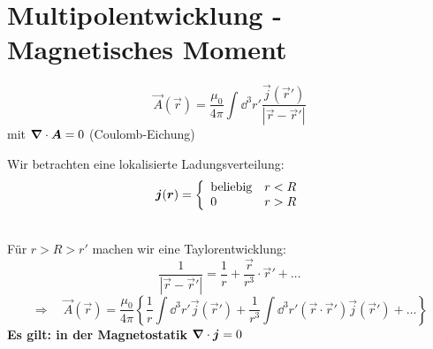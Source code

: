 \section{Multipolentwicklung - Magnetisches Moment}

\begin{equation*}
\vec{A}(\vec{r}) = \frac{\mu_0}{4 \pi} \int \dd ^3 r' \frac{\vec{j}(\vec{r}')}{|\vec{r} - \vec{r}'|}
\end{equation*}
mit $ \bm{\nabla} \cdot \bm{A} = 0 $ (Coulomb-Eichung)\\
\begin{minipage}{.5\linewidth}
	Wir betrachten eine lokalisierte Ladungsverteilung:
	\begin{equation*}
	\bm{j}(\bm{r}) = \left\{ \begin{array}{ll} {\textrm{beliebig}} & {r < R} \\ {0} & {r > R} \end{array} \right.
	\end{equation*}
\end{minipage}%
\begin{minipage}{.5\linewidth}
	\flushright
\end{minipage}%
\\
Für $ r > R > r' $ machen wir eine Taylorentwicklung:
\begin{equation*}
\frac{1}{|\vec{r} - \vec{r}'|} = \frac{1}{r} + \frac{\vec{r}}{r^3} \cdot \vec{r}' + \dots
\end{equation*}
\begin{equation*}
\Rightarrow \quad \vec{A}(\vec{r}) = \frac{\mu_0}{4 \pi} \left\{\frac{1}{r} \int \dd^3r' \vec{j} (\vec{r}') + \frac{1}{r^3} \int \dd ^3 r' (\vec{r} \cdot \vec{r}') \vec{j}(\vec{r}') + \dots \right\}
\end{equation*}
\textbf{Es gilt: in der Magnetostatik} $ \bm{\nabla} \cdot \bm{j} = 0 $
